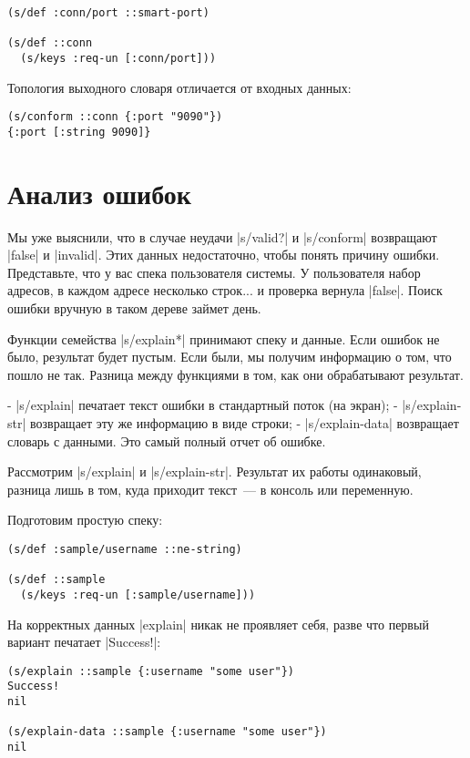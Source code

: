 \begin{verbatim}
(s/def :conn/port ::smart-port)

(s/def ::conn
  (s/keys :req-un [:conn/port]))
\end{verbatim}

Топология выходного словаря отличается от входных данных:

\begin{verbatim}
(s/conform ::conn {:port "9090"})
{:port [:string 9090]}
\end{verbatim}

\section{Анализ ошибок}

Мы уже выяснили, что в случае неудачи \spverb|s/valid?| и \spverb|s/conform| возвращают
\spverb|false| и \spverb|invalid|. Этих данных недостаточно, чтобы понять причину
ошибки. Представьте, что у вас спека пользователя системы. У пользователя набор
адресов, в каждом адресе несколько строк... и проверка вернула \spverb|false|. Поиск
ошибки вручную в таком дереве займет день.

Функции семейства \spverb|s/explain*| принимают спеку и данные. Если ошибок не было,
результат будет пустым. Если были, мы получим информацию о том, что пошло не
так. Разница между функциями в том, как они обрабатывают результат.

- \spverb|s/explain| печатает текст ошибки в стандартный поток (на экран);
- \spverb|s/explain-str| возвращает эту же информацию в виде строки;
- \spverb|s/explain-data| возвращает словарь с данными. Это самый полный отчет об
  ошибке.

Рассмотрим \spverb|s/explain| и \spverb|s/explain-str|. Результат их работы одинаковый,
разница лишь в том, куда приходит текст~--- в консоль или переменную.

Подготовим простую спеку:

\begin{verbatim}
(s/def :sample/username ::ne-string)

(s/def ::sample
  (s/keys :req-un [:sample/username]))
\end{verbatim}

На корректных данных \spverb|explain| никак не проявляет себя, разве что первый вариант
печатает \spverb|Success!|:

\begin{verbatim}
(s/explain ::sample {:username "some user"})
Success!
nil

(s/explain-data ::sample {:username "some user"})
nil
\end{verbatim}

